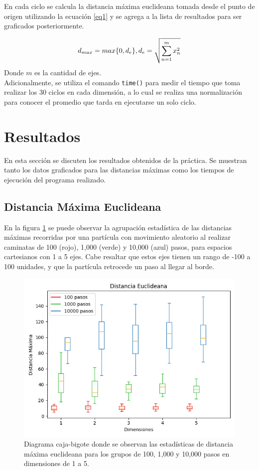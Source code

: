 \documentclass{article}
\begin{document}
En cada ciclo se calcula la distancia m\'axima euclideana tomada desde el punto de origen utilizando la ecuaci\'on \eqref{eq1} y se agrega a la lista de resultados para ser graficados posteriormente.

\begin{equation}
    d_{max} =max\{0, d_{e}\}, d_{e} = \sqrt{\sum_{n=1}^m x_{n}^{2}}\\ \label{eq1}
\end{equation}
Donde $m$ es la cantidad de ejes.\\

Adicionalmente, se utiliza el comando \texttt{time()} para medir el tiempo que toma realizar los 30 ciclos en cada dimensi\'on, a lo cual se realiza una normalizaci\'on para conocer el promedio que tarda en ejecutarse un solo ciclo.

\section{Resultados}
En esta secci\'on se discuten los resultados obtenidos de la pr\'actica. Se muestran tanto los datos graficados para las distancias m\'aximas como los tiempos de ejecuci\'on del programa realizado.

\subsection{Distancia M\'axima Euclideana}
En la figura \ref{figura1} se puede observar la agrupaci\'on estad\'istica de las distancias m\'aximas recorridas por una part\'icula con movimiento aleatorio al realizar caminatas de 100 (rojo), 1,000 (verde) y 10,000 (azul) pasos, para espacios cartesianos con 1 a 5 ejes. Cabe resaltar que estos ejes tienen un rango de -100 a 100 unidades, y que la part\'icula retrocede un paso al llegar al borde.

\begin{figure}[h]
    \centering
    \includegraphics[width=140mm]{DistanciaEucl.png}
    \caption{Diagrama caja-bigote donde se observan las estad\'isticas de distancia m\'axima euclideana para los grupos de 100, 1,000 y 10,000 pasos en dimensiones de 1 a 5.}
    \label{figura1}
\end{figure}
\end{document}
